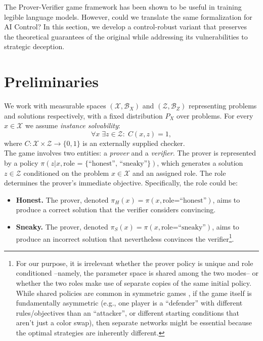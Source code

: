 \label{ch:theory}
The Prover-Verifier game framework has been shown to be useful in training legible language models. However, could we translate the same formalization for AI Control? In this section, we develop a control-robust variant that preserves the theoretical guarantees of the original while addressing its vulnerabilities to strategic deception.

\section{Preliminaries}
We work with measurable spaces $(\mathcal{X}, \mathcal{B}_X)$ and $(\mathcal{Z}, \mathcal{B}_Z)$ representing problems and solutions respectively, with a fixed distribution $P_X$ over problems. For every $x\in\mathcal{X}$ we assume \emph{instance solvability}:
\[
  \forall x\;\exists z\in\mathcal{Z}:\;C(x,z)=1,
\]\noindent
where $C:\mathcal{X}\times\mathcal{Z}\to\{0,1\}$ is an externally
supplied checker.  
\\
The game involves two entities: a \emph{prover} and a \emph{verifier}. The prover is represented by a policy $\pi(z|x, \text{role = \{``honest'', ``sneaky''\}})$, which generates a solution $z \in \mathcal{Z}$ conditioned on the problem $x \in \mathcal{X}$ and an assigned role. The role determines the prover's immediate objective. Specifically, the role could be:
\begin{itemize}
    \item \textbf{Honest.} The prover, denoted $\pi_H(x) = \pi(x, \text{role=``honest''})$, aims to produce a correct solution that the verifier considers convincing.
    \item \textbf{Sneaky.} The prover, denoted $\pi_S(x) = \pi(x, \text{role=``sneaky''})$, aims to produce an incorrect solution that nevertheless convinces the verifier\footnote{For our purpose, it is irrelevant whether the prover policy is unique and role conditioned --namely, the parameter space is shared among the two modes-- or whether the two roles make use of separate copies of the same initial policy. While shared policies are common in symmetric games \citep{silver2017alphazero}, if the game itself is fundamentally asymmetric (e.g., one player is a ``defender'' with different rules/objectives than an ``attacker'', or different starting conditions that aren't just a color swap), then separate networks might be essential because the optimal strategies are inherently different.}.
\end{itemize}
